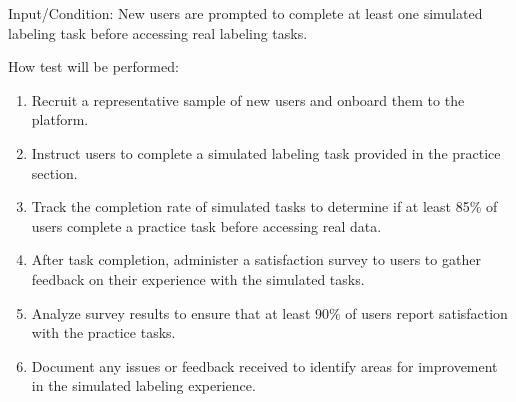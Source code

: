 \documentclass[12pt, titlepage]{article}
\begin{document}
\begin{enumerate}
Input/Condition: New users are prompted to complete at least one simulated labeling task before accessing real labeling tasks.

How test will be performed:
\begin{enumerate}
    \item Recruit a representative sample of new users and onboard them to the platform.
    \item Instruct users to complete a simulated labeling task provided in the practice section.
    \item Track the completion rate of simulated tasks to determine if at least 85\% of users complete a practice task before accessing real data.
    \item After task completion, administer a satisfaction survey to users to gather feedback on their experience with the simulated tasks.
    \item Analyze survey results to ensure that at least 90\% of users report satisfaction with the practice tasks.
    \item Document any issues or feedback received to identify areas for improvement in the simulated labeling experience.
\end{enumerate}


\end{enumerate}

\end{document}
